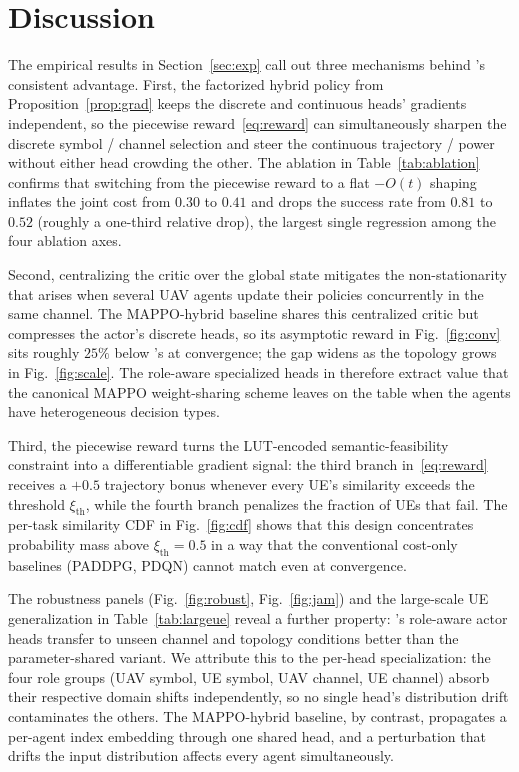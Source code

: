 \section{Discussion}\label{sec:disc}

The empirical results in Section~\ref{sec:exp} call out three
mechanisms behind \method's consistent advantage. First, the
factorized hybrid policy from Proposition~\ref{prop:grad} keeps the
discrete and continuous heads' gradients independent, so the
piecewise reward~\eqref{eq:reward} can simultaneously sharpen the
discrete symbol / channel selection and steer the continuous
trajectory / power without either head crowding the other. The
ablation in Table~\ref{tab:ablation} confirms that switching from the
piecewise reward to a flat $-O(t)$ shaping inflates the joint cost from
$0.30$ to $0.41$ and drops the success rate from $0.81$ to $0.52$
(roughly a one-third relative drop), the largest single regression
among the four ablation axes.

Second, centralizing the critic over the global state mitigates the
non-stationarity that arises when several UAV agents update their
policies concurrently in the same channel. The MAPPO-hybrid baseline
shares this centralized critic but compresses the actor's discrete
heads, so its asymptotic reward in Fig.~\ref{fig:conv} sits roughly
$25\%$ below \method's at convergence; the gap widens as the topology
grows in Fig.~\ref{fig:scale}. The role-aware specialized heads in
\method therefore extract value that the canonical MAPPO weight-sharing
scheme leaves on the table when the agents have heterogeneous decision
types.

Third, the piecewise reward turns the LUT-encoded semantic-feasibility
constraint into a differentiable gradient signal: the third branch
in~\eqref{eq:reward} receives a $+0.5$ trajectory bonus whenever every
UE's similarity exceeds the threshold $\xi_{\mathrm{th}}$, while the
fourth branch penalizes the fraction of UEs that fail. The per-task
similarity CDF in Fig.~\ref{fig:cdf} shows that this design
concentrates probability mass above $\xi_{\mathrm{th}}=0.5$ in a way
that the conventional cost-only baselines (PADDPG, PDQN) cannot match
even at convergence.

The robustness panels (Fig.~\ref{fig:robust}, Fig.~\ref{fig:jam}) and
the large-scale UE generalization in Table~\ref{tab:largeue} reveal a
further property: \method's role-aware actor heads transfer to
unseen channel and topology conditions better than the parameter-shared
variant. We attribute this to the per-head specialization: the four
role groups (UAV symbol, UE symbol, UAV channel, UE channel) absorb
their respective domain shifts independently, so no single head's
distribution drift contaminates the others. The MAPPO-hybrid baseline,
by contrast, propagates a per-agent index embedding through one shared
head, and a perturbation that drifts the input distribution affects
every agent simultaneously.

